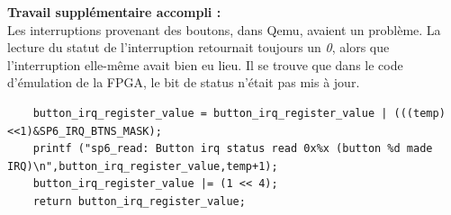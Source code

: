 \textbf{Travail supplémentaire accompli :}\\
Les interruptions provenant des boutons, dans Qemu, avaient un problème. La lecture du statut de l'interruption retournait toujours un \textit{0}, alors que l'interruption elle-même avait bien eu lieu. Il se trouve que dans le code d'émulation de la FPGA, le bit de status n'était pas mis à jour.

\begin{lstlisting}
	button_irq_register_value = button_irq_register_value | (((temp)<<1)&SP6_IRQ_BTNS_MASK);
	printf ("sp6_read: Button irq status read 0x%x (button %d made IRQ)\n",button_irq_register_value,temp+1);
	button_irq_register_value |= (1 << 4);
	return button_irq_register_value;
\end{lstlisting}